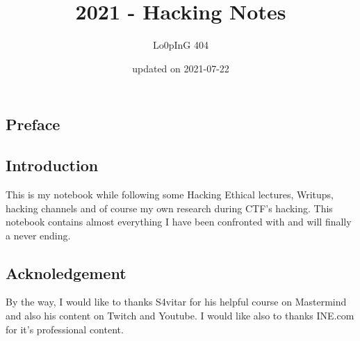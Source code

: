 \documentclass{assets/ipesethesis}
\title{2021 - Hacking Notes}
\author{Lo0pInG 404}
\date{updated on 2021-07-22}
\begin{document}
  \maketitle

\frontmatter %


  \begin{resume}
    \hypertarget{preface}{%
    \section*{Preface}\label{preface}}
    
    \hypertarget{introduction}{%
    \subsection*{Introduction}\label{introduction}}
    
    This is my notebook while following some Hacking Ethical lectures, Writups, hacking channels and of course my own research during CTF's hacking.
    This notebook contains almost everything I have been confronted with and will finally a never ending.
    
    \hypertarget{acknoledgement}{%
    \subsection*{Acknoledgement}\label{acknoledgement}}
    
    By the way, I would like to thanks S4vitar for his helpful course on Mastermind and also his content on Twitch and Youtube.
    I would like also to thanks INE.com for it's professional content.
  \end{resume}






  \hypersetup{linkcolor=black}
  \setcounter{tocdepth}{1}
  \tableofcontents


\mainmatter %
\pagestyle{fancyplain} %
\end{document}
